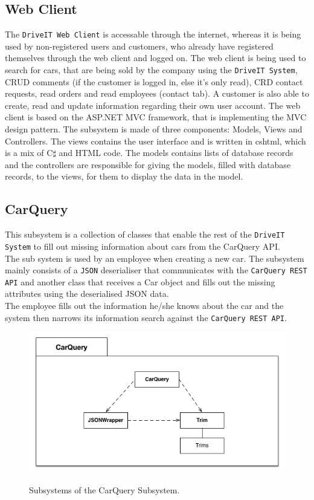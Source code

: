 \subsection{Web Client}
The \texttt{DriveIT Web Client} is accessable through the internet, whereas it is being used by non-registered users and customers, who already have registered themselves through the web client and logged on. The web client is being used to search for cars, that are being sold by the company using the \texttt{DriveIT System}, CRUD comments (if the customer is logged in, else it's only read), CRD contact requests, read orders and read employees (contact tab). A customer is also able to create, read and update information regarding their own user account.
The web client is based on the ASP.NET MVC framework, that is implementing the MVC design pattern. The subsystem is made of three components: Models, Views and Controllers. The views contains the user interface and is written in cshtml, which is a mix of C$\sharp$ and HTML code. The models contains lists of database records and the controllers are responsible for giving the models, filled with database records, to the views, for them to display the data in the model.

\subsection{CarQuery} 
This subsystem is a collection of classes that enable the rest of the \texttt{DriveIT System} to fill out missing information about cars from the CarQuery API.\\
The sub system is used by an employee when creating a new car. The subsystem mainly consists of a \texttt{JSON} deserialiser that communicates with the \texttt{CarQuery REST API} and another class that receives a Car object and fills out the missing attributes using the deserialised JSON data. \\
The employee fills out the information he/she knows about the car and the system then narrows its information search against the \texttt{CarQuery REST API}.
\begin{figure}[H]
	\centering
	\includegraphics[width=\textwidth]{Figures/CarQuerySubsystemDecomposition}\\
	\caption{Subsystems of the CarQuery Subsystem.}
\end{figure}